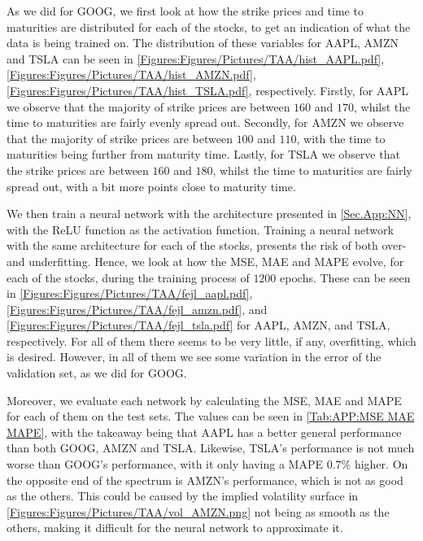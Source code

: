 
As we did for GOOG, we first look at how the strike prices and time to maturities are distributed for each of the stocks, to get an indication of what the data is being trained on. The distribution of these variables for AAPL, AMZN and TSLA can be seen in \autoref{Figures:Figures/Pictures/TAA/hist_AAPL.pdf}, \autoref{Figures:Figures/Pictures/TAA/hist_AMZN.pdf}, \autoref{Figures:Figures/Pictures/TAA/hist_TSLA.pdf}, respectively. Firstly, for AAPL we observe that the majority of strike prices are between $160$ and $170$, whilst the time to  maturities are fairly evenly spread out. Secondly, for AMZN we observe that the majority of strike prices are between $100$ and $110$, with the time to maturities being further from maturity time. Lastly, for TSLA we observe that the strike prices are between $160$ and $180$, whilst the time to maturities are fairly spread out, with a bit more points close to maturity time.

We then train a neural network with the architecture presented in \autoref{Sec.App:NN}, with the ReLU function as the activation function. Training a neural network with the same architecture for each of the stocks, presents the risk of both over- and underfitting. Hence, we look at how the MSE, MAE and MAPE evolve, for each of the stocks, during the training process of $1200$ epochs. These can be seen in \autoref{Figures:Figures/Pictures/TAA/fejl_aapl.pdf}, \autoref{Figures:Figures/Pictures/TAA/fejl_amzn.pdf}, and \autoref{Figures:Figures/Pictures/TAA/fejl_tsla.pdf} for AAPL, AMZN, and TSLA, respectively. For all of them there seems to be very little, if any, overfitting, which is desired. However, in all of them we see some variation in the error of the validation set, as we did for GOOG. 

Moreover, we evaluate each network by calculating the MSE, MAE and MAPE for each of them on the test sets. The values can be seen in \autoref{Tab:APP:MSE MAE MAPE}, with the takeaway being that AAPL has a better general performance than both GOOG, AMZN and TSLA. Likewise, TSLA's performance is not much worse than GOOG's performance, with it only having a MAPE $0.7\%$ higher. On the opposite end of the spectrum is AMZN's performance, which is not as good as the others. This could be caused by the implied volatility surface in \autoref{Figures:Figures/Pictures/TAA/vol_AMZN.png} not being as smooth as the others, making it difficult for the neural network to approximate it.

